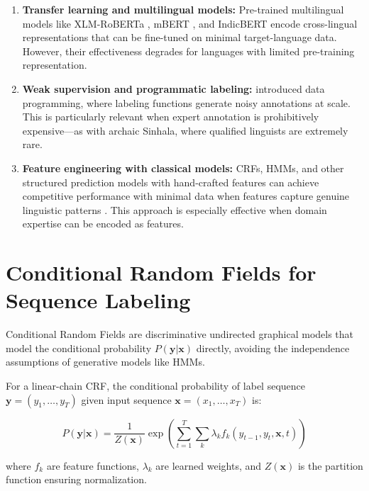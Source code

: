 \documentclass[12pt, a4paper, twoside]{report}
\begin{document}
\begin{enumerate}
    \item \textbf{Transfer learning and multilingual models:} Pre-trained multilingual models like XLM-RoBERTa \citep{conneau2020unsupervised}, mBERT \citep{devlin2019bert}, and IndicBERT \citep{kakwani2020indicnlpsuite} encode cross-lingual representations that can be fine-tuned on minimal target-language data. However, their effectiveness degrades for languages with limited pre-training representation.
    
    \item \textbf{Weak supervision and programmatic labeling:} \citet{ratner2017snorkel} introduced data programming, where labeling functions generate noisy annotations at scale. This is particularly relevant when expert annotation is prohibitively expensive—as with archaic Sinhala, where qualified linguists are extremely rare.
    
    \item \textbf{Feature engineering with classical models:} CRFs, HMMs, and other structured prediction models with hand-crafted features can achieve competitive performance with minimal data when features capture genuine linguistic patterns \citep{lafferty2001conditional}. This approach is especially effective when domain expertise can be encoded as features.
\end{enumerate}

\section{Conditional Random Fields for Sequence Labeling}
\label{sec:crf}

Conditional Random Fields \citep{lafferty2001conditional} are discriminative undirected graphical models that model the conditional probability $P(\mathbf{y}|\mathbf{x})$ directly, avoiding the independence assumptions of generative models like HMMs.

For a linear-chain CRF, the conditional probability of label sequence $\mathbf{y} = (y_1, \ldots, y_T)$ given input sequence $\mathbf{x} = (x_1, \ldots, x_T)$ is:

\begin{equation}
P(\mathbf{y}|\mathbf{x}) = \frac{1}{Z(\mathbf{x})} \exp\left(\sum_{t=1}^{T} \sum_{k} \lambda_k f_k(y_{t-1}, y_t, \mathbf{x}, t)\right)
\label{eq:crf}
\end{equation}

where $f_k$ are feature functions, $\lambda_k$ are learned weights, and $Z(\mathbf{x})$ is the partition function ensuring normalization.
\end{document}
